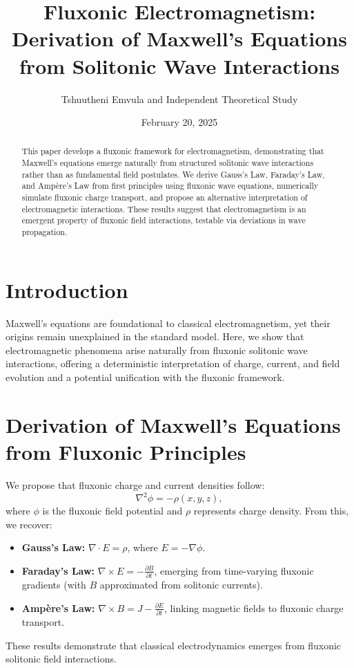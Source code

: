 \documentclass{article}
\title{Fluxonic Electromagnetism: Derivation of Maxwell's Equations from Solitonic Wave Interactions}
\author{Tshuutheni Emvula and Independent Theoretical Study}
\date{February 20, 2025}
\begin{document}
\maketitle

\begin{abstract}
This paper develops a fluxonic framework for electromagnetism, demonstrating that Maxwell’s equations emerge naturally from structured solitonic wave interactions rather than as fundamental field postulates. We derive Gauss’s Law, Faraday’s Law, and Ampère’s Law from first principles using fluxonic wave equations, numerically simulate fluxonic charge transport, and propose an alternative interpretation of electromagnetic interactions. These results suggest that electromagnetism is an emergent property of fluxonic field interactions, testable via deviations in wave propagation.
\end{abstract}

\section{Introduction}
Maxwell’s equations are foundational to classical electromagnetism, yet their origins remain unexplained in the standard model. Here, we show that electromagnetic phenomena arise naturally from fluxonic solitonic wave interactions, offering a deterministic interpretation of charge, current, and field evolution and a potential unification with the fluxonic framework.

\section{Derivation of Maxwell’s Equations from Fluxonic Principles}
We propose that fluxonic charge and current densities follow:
\begin{equation}
    \nabla^2 \phi = -\rho(x, y, z),
\end{equation}
where \(\phi\) is the fluxonic field potential and \(\rho\) represents charge density. From this, we recover:
\begin{itemize}
    \item \textbf{Gauss’s Law:} \(\nabla \cdot E = \rho\), where \(E = -\nabla \phi\).
    \item \textbf{Faraday’s Law:} \(\nabla \times E = -\frac{\partial B}{\partial t}\), emerging from time-varying fluxonic gradients (with \(B\) approximated from solitonic currents).
    \item \textbf{Ampère’s Law:} \(\nabla \times B = J - \frac{\partial E}{\partial t}\), linking magnetic fields to fluxonic charge transport.
\end{itemize}
These results demonstrate that classical electrodynamics emerges from fluxonic solitonic field interactions.
\end{document}
